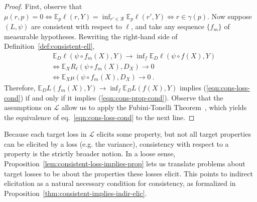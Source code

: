 \documentclass[11pt]{article} %
\newcommand{\propdis}{\mu}
\newcommand{\E}{\mathbb{E}}
\renewcommand{\L}{\mathcal{L}}
\newcommand{\R}{\mathcal{R}}
\newcommand{\exploss}[3]{\E_{#3} #1(#2,Y)}
\begin{document}
\begin{proof}
	First, observe that $\propdis(r,p) = 0 \iff \exploss{\ell}{r}{p} = \inf_{r' \in \R} \exploss{\ell}{r'}{p} \iff r \in \gamma(p)$.
	Now suppose $(L, \psi)$ are consistent with respect to $\ell$, and take any sequence $\{f_m\}$ of measurable hypotheses.
	Rewriting the right-hand side of Definition~\ref{def:consistent-ell},
	\begin{align}
	&\; \E_D \ell(\psi \circ f_m(X), Y)\to \inf\nolimits_f \E_D \ell(\psi \circ f(X), Y)   \label{eqn:cons-loss-cond} \\
	&\iff \E_X R_\ell(\psi \circ f_m(X), D_X) \to 0                               \nonumber  \\
	&\iff \E_X \propdis(\psi \circ f_m(X), D_X) \to 0~.~                          \label{eqn:cons-prop-cond}
	\end{align}
	Therefore, $\mathbb{E}_D L(f_m(X),Y) \to \inf_f \mathbb{E}_D L(f(X),Y)$ implies (\ref{eqn:cons-loss-cond}) if and only if it implies (\ref{eqn:cons-prop-cond}).
	Observe that the assumptions on $\L$ allow us to apply the Fubini-Tonelli Theorem~\cite[Theorem 2.37]{folland1999real}, which yields the equivalence of eq.~\ref{eqn:cons-loss-cond} to the next line.
\end{proof}

Because each target loss in $\L$ elicits some property, but not all target properties can be elicited by a loss (e.g. the variance), consistency with respect to a property is the strictly broader notion.
In a loose sense, Proposition~\ref{lem:consistent-loss-implies-prop} lets us translate problems about target losses to be about the properties these losses elicit.
This points to indirect elicitation as a natural necessary condition for consistency, as formalized in Proposition~\ref{thm:consistent-implies-indir-elic}.

\consistencyimpliesindirelic*
\end{document}
